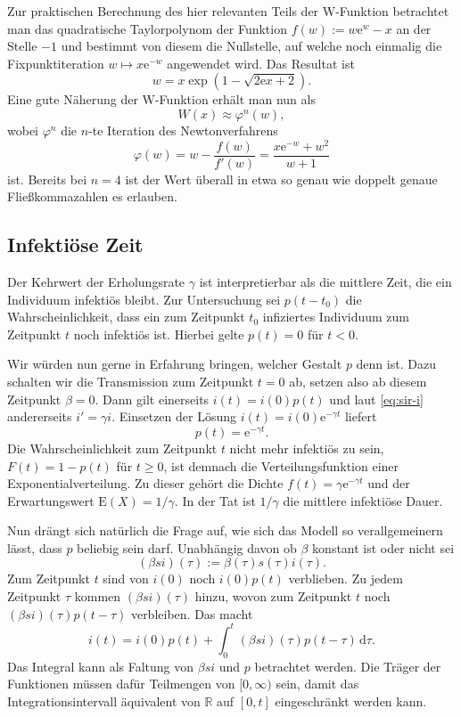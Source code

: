 \documentclass[a4paper,10pt,fleqn,twocolumn,twoside,dvipdfmx]{scrartcl}
\numberwithin{equation}{section}
\newcommand{\R}{\mathbb R}
\newcommand{\ee}{\mathrm e}
\begin{document}
Zur praktischen Berechnung des hier relevanten Teils der W-Funktion
betrachtet man das quadratische Taylorpolynom der
Funktion $f(w):=w\ee^w-x$ an der Stelle $-1$ und
bestimmt von diesem die Nullstelle, auf welche noch einmalig die
Fixpunktiteration $w\mapsto x\ee^{-w}$ angewendet
wird. Das Resultat ist
\[w = x\exp(1-\sqrt{2\ee x+2}).\]
Eine gute Näherung der W-Funktion erhält man nun als
\[W(x)\approx \varphi^n(w),\]
wobei $\varphi^n$ die $n$-te Iteration des Newtonverfahrens
\[\varphi(w) = w-\frac{f(w)}{f'(w)} = \frac{x\ee^{-w}+w^2}{w+1}\]
ist. Bereits bei $n=4$ ist der Wert überall in etwa so genau wie
doppelt genaue Fließkommazahlen es erlauben.

\subsection{Infektiöse Zeit}

Der Kehrwert der Erholungsrate $\gamma$ ist interpretierbar
als die mittlere Zeit, die ein Individuum infektiös bleibt. Zur
Untersuchung sei $p(t-t_0)$ die Wahrscheinlichkeit, dass ein zum Zeitpunkt
$t_0$ infiziertes Individuum zum Zeitpunkt $t$ noch infektiös ist.
Hierbei gelte $p(t)=0$ für $t<0$.

Wir würden nun gerne in Erfahrung bringen, welcher Gestalt $p$
denn ist. Dazu schalten wir die Transmission zum Zeitpunkt $t=0$
ab, setzen also ab diesem Zeitpunkt $\beta=0$. Dann gilt einerseits
$i(t)=i(0)p(t)$ und laut \eqref{eq:sir-i} andererseits
$i'=\gamma i$. Einsetzen der Lösung $i(t)=i(0)\ee^{-\gamma t}$
liefert%
\begin{equation}
p(t) = \ee^{-\gamma t}.
\end{equation}
Die Wahrscheinlichkeit zum Zeitpunkt $t$ nicht mehr infektiös zu sein,
$F(t)=1-p(t)$ für $t\ge 0$, ist demnach
die Verteilungsfunktion einer Exponentialverteilung.
Zu dieser gehört die Dichte
$f(t)=\gamma\ee^{-\gamma t}$ und der Erwartungswert
$\mathrm E(X) = 1/\gamma$. In der Tat ist $1/\gamma$ die mittlere
infektiöse Dauer.

Nun drängt sich natürlich die Frage auf, wie sich das Modell so
verallgemeinern lässt, dass $p$ beliebig sein darf.
Unabhängig davon ob $\beta$ konstant ist oder nicht sei
\[(\beta si)(\tau) := \beta(\tau)s(\tau)i(\tau).\]
Zum Zeitpunkt $t$ sind von $i(0)$ noch $i(0)p(t)$ verblieben.
Zu jedem Zeitpunkt $\tau$ kommen $(\beta si)(\tau)$ hinzu,
wovon zum Zeitpunkt $t$ noch $(\beta si)(\tau)p(t-\tau)$ verbleiben.
Das macht%
\begin{equation}\label{eq:int-eq-i}
i(t) = i(0)p(t) + \int_0^t (\beta si)(\tau)p(t-\tau)\,\mathrm d\tau.
\end{equation}
Das Integral kann als Faltung von $\beta si$ und $p$ betrachtet
werden. Die Träger der Funktionen müssen dafür Teilmengen von
$[0,\infty)$ sein, damit das Integrationsintervall äquivalent
von $\R$ auf $[0,t]$ eingeschränkt werden kann.
\end{document}
